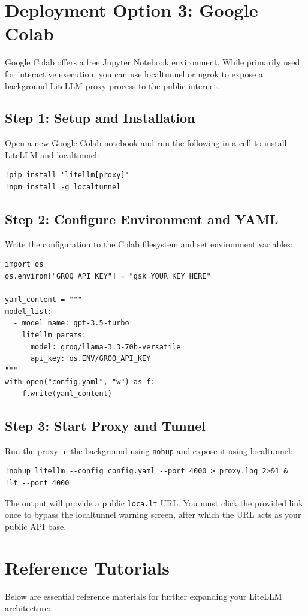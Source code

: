 \documentclass[12pt,a4paper]{article}
\begin{document}
\section{Deployment Option 3: Google Colab}
Google Colab offers a free Jupyter Notebook environment. While primarily used for interactive execution, you can use localtunnel or ngrok to expose a background LiteLLM proxy process to the public internet.

\subsection{Step 1: Setup and Installation}
Open a new Google Colab notebook and run the following in a cell to install LiteLLM and localtunnel:
\begin{verbatim}
!pip install 'litellm[proxy]'
!npm install -g localtunnel
\end{verbatim}

\subsection{Step 2: Configure Environment and YAML}
Write the configuration to the Colab filesystem and set environment variables:
\begin{verbatim}
import os
os.environ["GROQ_API_KEY"] = "gsk_YOUR_KEY_HERE"

yaml_content = """
model_list:
  - model_name: gpt-3.5-turbo
    litellm_params:
      model: groq/llama-3.3-70b-versatile
      api_key: os.ENV/GROQ_API_KEY
"""
with open("config.yaml", "w") as f:
    f.write(yaml_content)
\end{verbatim}

\subsection{Step 3: Start Proxy and Tunnel}
Run the proxy in the background using \texttt{nohup} and expose it using localtunnel:
\begin{verbatim}
!nohup litellm --config config.yaml --port 4000 > proxy.log 2>&1 &
!lt --port 4000
\end{verbatim}
The output will provide a public \texttt{loca.lt} URL. You must click the provided link once to bypass the localtunnel warning screen, after which the URL acts as your public API base.

\section{Reference Tutorials}
Below are essential reference materials for further expanding your LiteLLM architecture:
\end{document}
